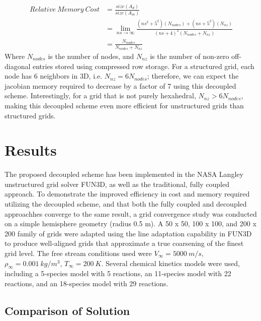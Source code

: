 \documentclass[]{aiaa-tc}%
\begin{document}
%
\begin{equation}
\label{mem_req_eq}
\begin{split}
	Relative\ Memory\ Cost &= \frac{size(A_d)}{size(A_m)} \\
	&= \lim_{ns\to\infty} \frac{(ns^2+5^2)(N_{nodes})+(ns+5^2)(N_{nz})}{(ns+4)^2(N_{nodes}+N_{nz})} \\
	&= \frac{N_{nodes}}{N_{nodes} + N_{nz}}
\end{split}
\end{equation}
%
Where $N_{nodes}$ is the number of nodes, and $N_{nz}$ is the number of non-zero off-diagonal entries stored using compressed row storage. For a structured grid, each node has 6 neighbors in 3D, i.e. $N_{nz} = 6N_{nodes}$; therefore, we can expect the jacobian memory required to decrease by a factor of 7 using this decoupled scheme. Interestingly, for a grid that is not purely hexahedral, $N_{nz} > 6N_{nodes}$, making this decoupled scheme even more efficient for unstructured grids than structured grids.

\section{Results}

The proposed decoupled scheme has been implemented in the NASA Langley unstructured grid solver FUN3D\cite{FUN3D}, as well as the traditional, fully coupled approach.  To demonstrate the improved efficiency in cost and memory required utilizing the decoupled scheme, and that both the fully coupled and decoupled approachhes converge to the same result, a grid convergence study was conducted on a simple hemisphere geometry (radius 0.5 m).  A 50 x 50, 100 x 100, and 200 x 200 family of grids were adapted using the line adaptation capability in FUN3D to produce well-aligned grids that approximate a true coarsening of the finest grid level.  The free stream conditions used were $V_{\infty} = 5000\ m/s$, $\rho_{\infty}=0.001\ kg/m^3$, $T_\infty = 200\ K$.  Several chemical kinetics models were used, including a 5-species model with 5 reactions, an 11-species model with 22 reactions, and an 18-species model with 29 reactions. 

\subsection{Comparison of Solution}
\end{document}
